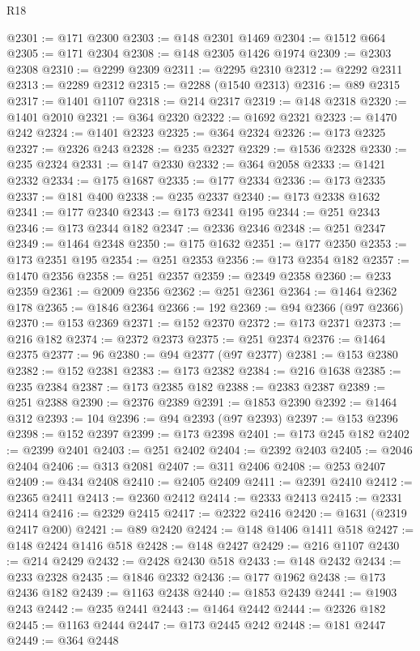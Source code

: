 \begin{lexlean}{R18}
\begin{coremodule}
@2301 := @171 @2300
@2303 := @148 @2301 @1469
@2304 := @1512 @664
@2305 := @171 @2304
@2308 := @148 @2305 @1426 @1974
@2309 := @2303 @2308
@2310 := @2299 @2309
@2311 := @2295 @2310
@2312 := @2292 @2311
@2313 := @2289 @2312
@2315 := @2288 (@1540 @2313)
@2316 := @89 @2315
@2317 := @1401 @1107
@2318 := @214 @2317
@2319 := @148 @2318
@2320 := @1401 @2010
@2321 := @364 @2320
@2322 := @1692 @2321
@2323 := @1470 @242
@2324 := @1401 @2323
@2325 := @364 @2324
@2326 := @173 @2325
@2327 := @2326 @243
@2328 := @235 @2327
@2329 := @1536 @2328
@2330 := @235 @2324
@2331 := @147 @2330
@2332 := @364 @2058
@2333 := @1421 @2332
@2334 := @175 @1687
@2335 := @177 @2334
@2336 := @173 @2335
@2337 := @181 @400
@2338 := @235 @2337
@2340 := @173 @2338 @1632
@2341 := @177 @2340
@2343 := @173 @2341 @195
@2344 := @251 @2343
@2346 := @173 @2344 @182
@2347 := @2336 @2346
@2348 := @251 @2347
@2349 := @1464 @2348
@2350 := @175 @1632
@2351 := @177 @2350
@2353 := @173 @2351 @195
@2354 := @251 @2353
@2356 := @173 @2354 @182
@2357 := @1470 @2356
@2358 := @251 @2357
@2359 := @2349 @2358
@2360 := @233 @2359
@2361 := @2009 @2356
@2362 := @251 @2361
@2364 := @1464 @2362 @178
@2365 := @1846 @2364
@2366 := 192
@2369 := @94 @2366 (@97 @2366)
@2370 := @153 @2369
@2371 := @152 @2370
@2372 := @173 @2371
@2373 := @216 @182
@2374 := @2372 @2373
@2375 := @251 @2374
@2376 := @1464 @2375
@2377 := 96
@2380 := @94 @2377 (@97 @2377)
@2381 := @153 @2380
@2382 := @152 @2381
@2383 := @173 @2382
@2384 := @216 @1638
@2385 := @235 @2384
@2387 := @173 @2385 @182
@2388 := @2383 @2387
@2389 := @251 @2388
@2390 := @2376 @2389
@2391 := @1853 @2390
@2392 := @1464 @312
@2393 := 104
@2396 := @94 @2393 (@97 @2393)
@2397 := @153 @2396
@2398 := @152 @2397
@2399 := @173 @2398
@2401 := @173 @245 @182
@2402 := @2399 @2401
@2403 := @251 @2402
@2404 := @2392 @2403
@2405 := @2046 @2404
@2406 := @313 @2081
@2407 := @311 @2406
@2408 := @253 @2407
@2409 := @434 @2408
@2410 := @2405 @2409
@2411 := @2391 @2410
@2412 := @2365 @2411
@2413 := @2360 @2412
@2414 := @2333 @2413
@2415 := @2331 @2414
@2416 := @2329 @2415
@2417 := @2322 @2416
@2420 := @1631 (@2319 @2417 @200)
@2421 := @89 @2420
@2424 := @148 @1406 @1411 @518
@2427 := @148 @2424 @1416 @518
@2428 := @148 @2427
@2429 := @216 @1107
@2430 := @214 @2429
@2432 := @2428 @2430 @518
@2433 := @148 @2432
@2434 := @233 @2328
@2435 := @1846 @2332
@2436 := @177 @1962
@2438 := @173 @2436 @182
@2439 := @1163 @2438
@2440 := @1853 @2439
@2441 := @1903 @243
@2442 := @235 @2441
@2443 := @1464 @2442
@2444 := @2326 @182
@2445 := @1163 @2444
@2447 := @173 @2445 @242
@2448 := @181 @2447
@2449 := @364 @2448

\end{coremodule}
\end{lexlean}

